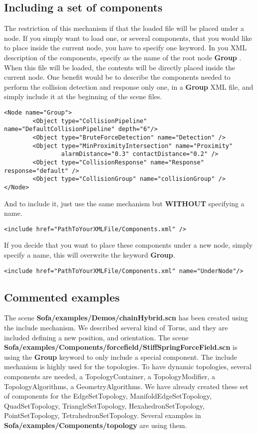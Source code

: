 \subsection{Including a set of components}
The restriction of this mechanism if that the loaded file will be placed under a node. If you simply want to load one, or several components, that you would like to place inside the current node, you have to specify one keyword.
In you XML description of the components, specify as the name of the root node { \bf Group }. When this file will be loaded, the contents will be directly placed inside the current node.
One benefit would be to describe the components needed to perform the collision detection and response only one, in a { \bf Group } XML file, and simply include it at the beginning of the scene files.
\begin{verbatim}
<Node name="Group">
        <Object type="CollisionPipeline" name="DefaultCollisionPipeline" depth="6"/>
        <Object type="BruteForceDetection" name="Detection" />
        <Object type="MinProximityIntersection" name="Proximity" 
                alarmDistance="0.3" contactDistance="0.2" />
        <Object type="CollisionResponse" name="Response" response="default" />
        <Object type="CollisionGroup" name="collisionGroup" />
</Node>
\end{verbatim}

And to include it, just use the same mechanism but { \bf WITHOUT} specifying a name.
\begin{verbatim}
<include href="PathToYourXMLFile/Components.xml" />
\end{verbatim}

If you decide that you want to place these components under a new node, simply specify a name, this will overwrite the keyword { \bf Group}.
\begin{verbatim}
<include href="PathToYourXMLFile/Components.xml" name="UnderNode"/>
\end{verbatim}

\subsection{Commented examples}
The scene { \bf Sofa/examples/Demos/chainHybrid.scn} has been created using the include mechanism. We described several kind of Torus, and they are included defining a new position, and orientation.
The scene { \bf Sofa/examples/Components/forcefield/StiffSpringForceField.scn} is using the { \bf Group} keyword to only include a special component.
The include mechanism is highly used for the topologies. To have dynamic topologies, several components are needed, a TopologyContainer, a TopologyModifier, a TopologyAlgorithms, a GeometryAlgorithms. We have already created these set of components for the EdgeSetTopology, ManifoldEdgeSetTopology, QuadSetTopology, TriangleSetTopology, HexahedronSetTopology, PointSetTopology, TetrahedronSetTopology. Several examples in {\bf Sofa/examples/Components/topology} are using them.
